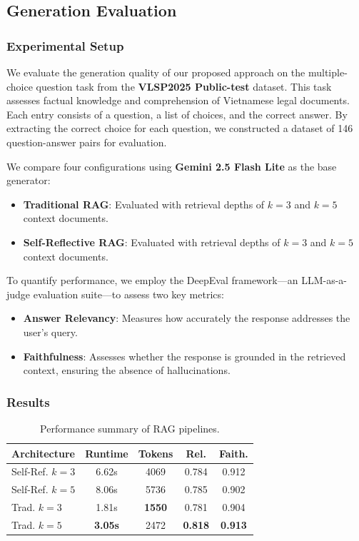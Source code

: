 \documentclass[letterpaper]{article} %
\begin{document}
\subsection{Generation Evaluation}

\subsubsection{Experimental Setup}

We evaluate the generation quality of our proposed approach on the multiple-choice question task from the \textbf{VLSP2025 Public-test} dataset. This task assesses factual knowledge and comprehension of Vietnamese legal documents. Each entry consists of a question, a list of choices, and the correct answer. By extracting the correct choice for each question, we constructed a dataset of 146 question-answer pairs for evaluation.

We compare four configurations using \textbf{Gemini 2.5 Flash Lite} as the base generator:
\begin{itemize}
    \item \textbf{Traditional RAG}: Evaluated with retrieval depths of $k=3$ and $k=5$ context documents.
    \item \textbf{Self-Reflective RAG}: Evaluated with retrieval depths of $k=3$ and $k=5$ context documents.
\end{itemize}

To quantify performance, we employ the {DeepEval} framework---an LLM-as-a-judge evaluation suite---to assess two key metrics:
\begin{itemize}
    \item \textbf{Answer Relevancy}: Measures how accurately the response addresses the user's query.
    \item \textbf{Faithfulness}: Assesses whether the response is grounded in the retrieved context, ensuring the absence of hallucinations.
\end{itemize}

\subsubsection{Results}

\begin{table}[htbp]
	\centering
	\caption{Performance summary of RAG pipelines.}
	\label{tab:rag_summary}
	\begin{tabular}{lcccc}
		\toprule
		\textbf{Architecture} & \textbf{Runtime} & \textbf{Tokens} & \textbf{Rel.}  & \textbf{Faith.} \\
		\midrule
		Self-Ref. $k=3$    & 6.62s            & 4069            & 0.784          & 0.912           \\
		Self-Ref. $k=5$    & 8.06s            & 5736            & 0.785          & 0.902           \\
		Trad. $k=3$     & 1.81s            & \textbf{1550}            & 0.781          & 0.904           \\
		Trad. $k=5$     & \textbf{3.05s}   & 2472            & \textbf{0.818} & \textbf{0.913}  \\
		\bottomrule
	\end{tabular}
\end{table}
\end{document}
